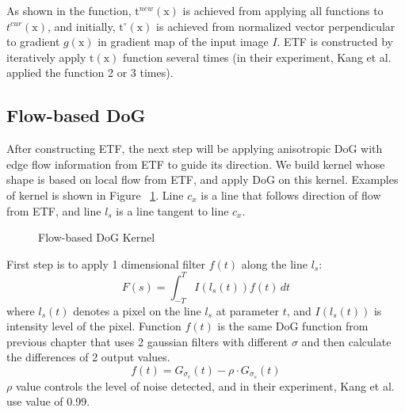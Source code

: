 As shown in the function, $\mbox{t}^{new}(\mbox{x})$ is achieved from applying all functions to $t^{cur}(\mbox{x})$, and initially, $\mbox{t}^{\circ}(\mbox{x})$ is achieved from normalized vector perpendicular to gradient $g(\mbox{x})$ in gradient map of the input image $I$. ETF is constructed by iteratively apply $\mbox{t}(\mbox{x})$ function several times (in their experiment, Kang et al. applied the function 2 or 3 times).


\subsection{Flow-based DoG}
After constructing ETF, the next step will be applying anisotropic DoG with edge flow information from ETF to guide its direction. We build kernel whose shape is based on local flow from ETF, and apply DoG on this kernel. Examples of kernel is shown in Figure ~\ref{fig:FDoG_kernel}. Line $c_{x}$ is a line that follows direction of flow from ETF, and line $l_{s}$ is a line tangent to line $c_{x}$. 
\begin{figure}[H]
	\centering
	\caption{Flow-based DoG Kernel}\label{fig:FDoG_kernel}
\end{figure}

First step is to apply 1 dimensional filter $f(t)$ along the line $l_{s}$:
\begin{equation}
	F(s) = \int_{-T}^{T} I(l_s(t))f(t)\,dt
\end{equation}
where $l_s(t)$ denotes a pixel on the line $l_s$ at parameter $t$, and $I(l_s(t))$ is intensity level of the pixel. Function $f(t)$ is the same DoG function from previous chapter that uses 2 gaussian filters with different $\sigma$ and then calculate the differences of 2 output values. 
\begin{equation}
	f(t) = G_{\sigma_{c}}(t)-\rho \cdot G_{\sigma_{s}}(t)
\end{equation}
$\rho$ value controls the level of noise detected, and in their experiment, Kang et al. use value of 0.99.

